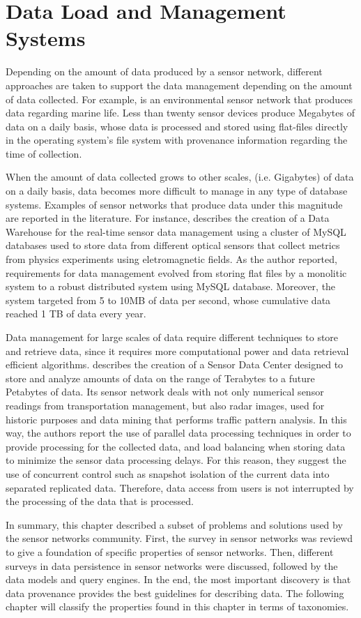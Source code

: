 \section{Data Load and Management Systems}
\label{sec:data-load}

Depending on the amount of data produced by a sensor network, different
approaches are taken to support the data management depending on
the amount of data collected. For example, \cite{sfbeams2006} is an
environmental sensor network that produces data regarding marine life.
Less than twenty sensor devices produce Megabytes of data on a daily basis,
whose data is processed and stored using flat-files directly in the
operating system's file system with provenance information regarding the time
of collection.

When the amount of data collected grows to other scales, (i.e. Gigabytes) of data
on a daily basis, data becomes more difficult to manage in any type of
database systems. Examples of sensor networks that produce data under this
magnitude are reported in the literature. For instance, 
\cite{sn-dataware-house} describes the creation of a Data Warehouse for the
real-time sensor data management using a cluster of MySQL databases used to
store data from different optical sensors that collect metrics
from physics experiments using eletromagnetic fields. As the author reported,
requirements for data management evolved from storing flat files by a
monolitic system to a robust distributed system using MySQL database.
Moreover, the system targeted from 5 to 10MB of data per second, whose
cumulative data reached 1 TB of data every year.

Data management for large scales of data require different techniques to store
and retrieve data, since it requires more computational power and data
retrieval efficient algorithms. \cite{sn-data-center} describes the creation of
a Sensor Data Center designed to store and analyze amounts of data on the range of
Terabytes to a future Petabytes of data. Its sensor network deals with not only
numerical sensor readings from transportation management, but also radar
images, used for historic purposes and data mining that performs traffic
pattern analysis. In this way, the authors report the use of parallel data
processing techniques in order to provide processing for the collected
data, and load balancing when storing data to minimize the sensor data
processing delays. For this reason, they suggest the use of concurrent control
such as snapshot isolation of the current data into separated replicated data.
Therefore, data access from users is not interrupted by the processing of
the data that is processed.

In summary, this chapter described a subset of problems and solutions used by
the sensor networks community. First, the survey in sensor networks was
reviewd to give a foundation of specific properties of sensor networks. Then,
different surveys in data persistence in sensor networks were discussed,
followed by the data models and query engines. In the end, the most important 
discovery is that data provenance provides the best guidelines for describing 
data. The following chapter will classify the properties found in this chapter
in terms of taxonomies.